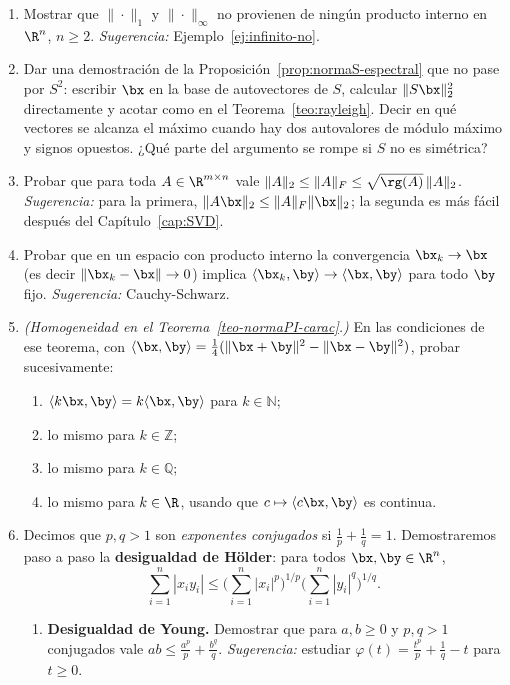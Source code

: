 \begin{enumerate}
\item\label{ejer-normainfty} Mostrar que $\|\cdot\|_1$ y $\|\cdot\|_\infty$
no provienen de ningún producto interno en $\R^n$, $n\ge2$.
\emph{Sugerencia:} Ejemplo~\ref{ej:infinito-no}.

\item\label{ejer-normaS} Dar una demostración de la
Proposición~\ref{prop:normaS-espectral} que no pase por $S^2$: escribir
$\bx$ en la base de autovectores de $S$, calcular $\|S\bx\|_2^2$
directamente y acotar como en el Teorema~\ref{teo:rayleigh}. Decir en qué
vectores se alcanza el máximo cuando hay dos autovalores de módulo máximo y
signos opuestos. ¿Qué parte del argumento se rompe si $S$ no es simétrica?

\item Probar que para toda $A\in\R^{m\times n}$ vale
$\|A\|_2\le\|A\|_F\le\sqrt{\rg(A)}\,\|A\|_2$. \emph{Sugerencia:} para la
primera, $\|A\bx\|_2\le\|A\|_F\|\bx\|_2$; la segunda es más fácil después del
Capítulo~\ref{cap:SVD}.

\item Probar que en un espacio con producto interno la convergencia
$\bx_k\to\bx$ (es decir $\|\bx_k-\bx\|\to0$) implica
$\langle\bx_k,\by\rangle\to\langle\bx,\by\rangle$ para todo $\by$ fijo.
\emph{Sugerencia:} Cauchy-Schwarz.

\item\label{ej-homoPI} \emph{(Homogeneidad en el Teorema~\ref{teo-normaPI-carac}.)}
En las condiciones de ese teorema, con
$\langle\bx,\by\rangle=\frac14(\|\bx+\by\|^2-\|\bx-\by\|^2)$, probar
sucesivamente:
\begin{enumerate}[label=\textup{(\alph*)}]
\item $\langle k\bx,\by\rangle=k\langle\bx,\by\rangle$ para $k\in\mathbb{N}$;
\item lo mismo para $k\in\mathbb{Z}$;
\item lo mismo para $k\in\mathbb{Q}$;
\item lo mismo para $k\in\R$, usando que $c\mapsto\langle c\bx,\by\rangle$ es
continua.
\end{enumerate}

\item\label{ejer-holder} Decimos que $p,q>1$ son \emph{exponentes conjugados}
si $\frac1p+\frac1q=1$. Demostraremos paso a paso la
\textbf{desigualdad de Hölder}: para todos
$\bx,\by\in\R^n$,
\[
\sum_{i=1}^n|x_iy_i|\le\Big(\sum_{i=1}^n|x_i|^p\Big)^{1/p}
\Big(\sum_{i=1}^n|y_i|^q\Big)^{1/q} .
\]
\begin{enumerate}
\item \textbf{Desigualdad de Young.} Demostrar que para $a,b\ge0$ y $p,q>1$
conjugados vale $ab\le\frac{a^p}{p}+\frac{b^q}{q}$.
\emph{Sugerencia:} estudiar $\varphi(t)=\frac{t^p}{p}+\frac1q-t$ para
$t\ge0$.


\end{enumerate}
\end{enumerate}
